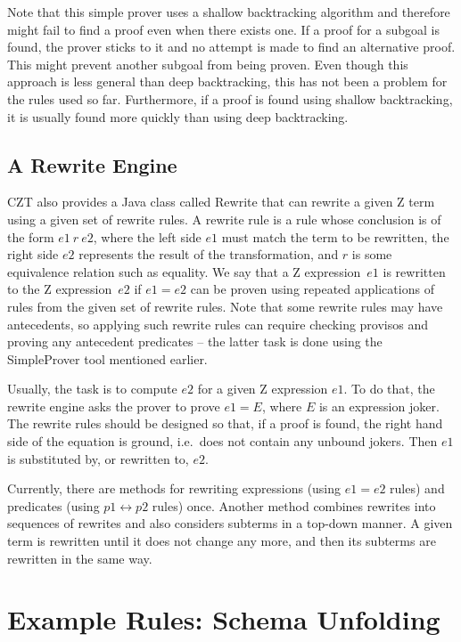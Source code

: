 \documentclass{entcs}
\begin{document}
Note that this simple prover uses a shallow backtracking algorithm and
therefore might fail to find a proof even when there exists one.  If a
proof for a subgoal is found, the prover sticks to it and no attempt
is made to find an alternative proof.  This might prevent another
subgoal from being proven.  Even though this approach is less general
than deep backtracking, this has not been a problem for the rules used
so far.  Furthermore, if a proof is found using shallow backtracking,
it is usually found more quickly than using deep backtracking.

\subsection{A Rewrite Engine}

CZT also provides a Java class called Rewrite that can rewrite a given
Z term using a given set of rewrite rules.  A rewrite rule is a rule
whose conclusion is of the form $e1~r~e2$, where the left side $e1$
must match the term to be rewritten, the right side $e2$ represents
the result of the transformation, and $r$ is some equivalence relation
such as equality.  We say that a Z expression~$e1$ is rewritten to the
Z expression~$e2$ if $e1 = e2$ can be proven using repeated
applications of rules from the given set of rewrite rules.  Note that
some rewrite rules may have antecedents, so applying such rewrite
rules can require checking provisos and proving any antecedent
predicates -- the latter task is done using the SimpleProver tool
mentioned earlier.

Usually, the task is to compute $e2$ for a given Z expression $e1$.
To do that, the rewrite engine asks the prover to prove $e1 = E$,
where $E$ is an expression joker.  The rewrite rules should be
designed so that, if a proof is found, the right hand side of the
equation is ground, i.e.\ does not contain any unbound jokers.  Then
$e1$ is substituted by, or rewritten to, $e2$.

Currently, there are methods for rewriting expressions (using $e1 =
e2$ rules) and predicates (using $p1 \leftrightarrow p2$ rules) once.
Another method combines rewrites into sequences of rewrites and also
considers subterms in a top-down manner.  A given term is rewritten
until it does not change any more, and then its subterms are rewritten
in the same way.


\section{Example Rules: Schema Unfolding} \label{sec:schemas}
\end{document}
